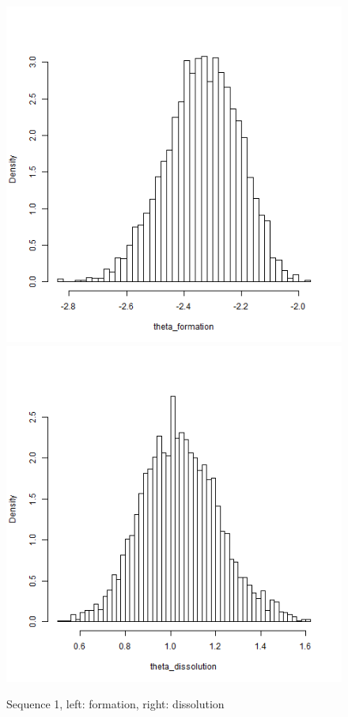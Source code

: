 \documentclass[aspectratio=169,ignorenonframetext,9pt]{beamer}
\theoremstyle{plain}
\theoremstyle{definition}
\begin{document}
\begin{figure}[h]
    \begin{center}
        \includegraphics[scale=0.23]{pictures/net1seq_chain1_BSTERGM_formation_histogram.png}
        \includegraphics[scale=0.23]{pictures/net1seq_chain1_BSTERGM_dissolution_histogram.png}
    \caption{Sequence 1, left: formation, right: dissolution}
    \end{center}
\end{figure}
\end{document}
